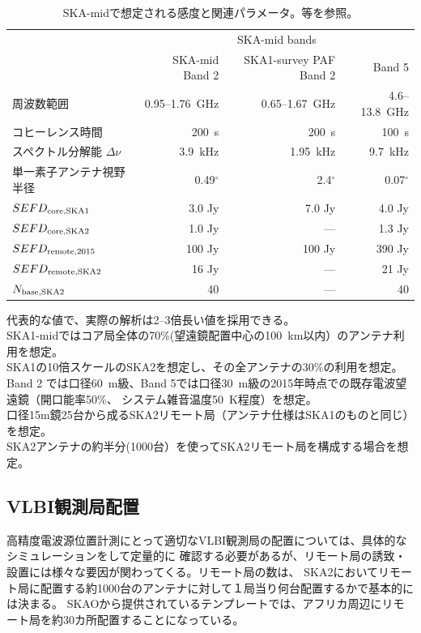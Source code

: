 \begin{table}[h]
\caption{SKA-midで想定される感度と関連パラメータ。\citet{SKA1-BD}等を参照。}\label{c7.s2.t1}
\begin{center}
\vspace{-3mm}
\begin{tabular}{lrrr} \hline\hline
 & \multicolumn{3}{c}{SKA-mid bands} \\
 & SKA-mid Band 2 & SKA1-survey PAF Band 2 & Band 5 \\ \hline 
周波数範囲 &  0.95--1.76~GHz & 0.65--1.67~GHz & 4.6--13.8~GHz \\
コヒーレンス時間\footnotemark[1] & 200~s & 200~s & 100~s \\
スペクトル分解能 $\Delta \nu$ & 3.9~kHz & 1.95~kHz & 9.7~kHz \\
単一素子アンテナ視野半径 & 0.49$^{\circ}$ & 2.4$^{\circ}$ & 0.07$^{\circ}$ \\
$SEFD_{\rm core,SKA1}$\footnotemark[2] & 3.0 Jy & 7.0 Jy & 4.0 Jy \\
$SEFD_{\rm core,SKA2}$\footnotemark[3] & 1.0 Jy & --- & 1.3 Jy \\
$SEFD_{\rm remote,2015}$\footnotemark[4] & 100 Jy & 100 Jy & 390 Jy \\
$SEFD_{\rm remote,SKA2}$\footnotemark[5] & 16 Jy & --- & 21 Jy \\
$N_{\rm base, SKA2}$\footnotemark[6] & 40 & --- & 40 \\
\hline
\end{tabular}
\end{center}
\vspace{-3mm}\noindent
\footnotemark[1]代表的な値で、実際の解析は2--3倍長い値を採用できる。\\
\footnotemark[2]SKA1-midではコア局全体の70\%(望遠鏡配置中心の100~km以内）のアンテナ利用を想定。\\
\footnotemark[3]SKA1の10倍スケールのSKA2を想定し、その全アンテナの30\%の利用を想定。\\
\footnotemark[4]Band 2 では口径60~m級、Band 5では口径30~m級の2015年時点での既存電波望遠鏡（開口能率50\%、
システム雑音温度50~K程度）を想定。 \\
\footnotemark[5]口径15m鏡25台から成るSKA2リモート局（アンテナ仕様はSKA1のものと同じ）を想定。 \\
\footnotemark[6]SKA2アンテナの約半分(1000台）を使ってSKA2リモート局を構成する場合を想定。
\end{table}

\setcounter{subsection}{1}\subsection{VLBI観測局配置}\label{c7.s2.ss2}
高精度電波源位置計測にとって適切なVLBI観測局の配置については、具体的なシミュレーションをして定量的に
確認する必要があるが、リモート局の誘致・設置には様々な要因が関わってくる。リモート局の数は、
SKA2においてリモート局に配置する約1000台のアンテナに対して１局当り何台配置するかで基本的には決まる。
SKAOから提供されているテンプレートでは、アフリカ周辺にリモート局を約30カ所配置することになっている。

